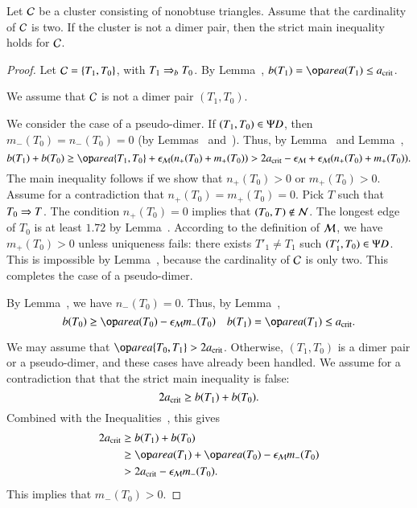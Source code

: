 \begin{lemma} 
  Let $\mathcal C$ be a cluster consisting of nonobtuse triangles.  Assume
  that the cardinality of $\mathcal C$ is two.  If the cluster is not a dimer
  pair, then the strict main inequality holds for $\mathcal C$.
\end{lemma}

\begin{proof}  
  Let $\mathcal C = \{T_1,T_0\}$, with $T_1\Rightarrow_{b} T_0$. By
  Lemma~, $b(T_1)=\area(T_1)\le \acrit$.

  We assume that $\mathcal C$ is not a dimer pair $(T_1,T_0)$.

  We consider the case of a pseudo-dimer.  If $(T_1,T_0)\in\Psi D$, then
  $m_-(T_0)=n_-(T_0)=0$ (by Lemmas~
  and~).  Thus, by Lemma~ and
  Lemma~,
\[
b(T_1)+b(T_0) 
\ge \area\{T_1,T_0\} + \epsM (n_+(T_0) + m_+(T_0)) 
> 2\acrit - \epsM  + \epsM (n_+(T_0)+m_+(T_0)).
\]
The main inequality follows if we show that $n_+(T_0)>0$ or
$m_+(T_0)>0$.  Assume for a contradiction that $n_+(T_0)=m_+(T_0)=0$.
Pick $T$ such that $T_0\Rightarrow T$.  The condition $n_+(T_0)=0$ implies
that $(T_0,T)\not\in\mathcal N$.  The longest edge of $T_0$ is at least $1.72$
by Lemma~.  According to the definition of $\mathcal M$, we
have $m_+(T_0)>0$ unless uniqueness fails: there exists $T'_1\ne T_1$
such $(T'_1,T_0)\in\Psi D$.  This is impossible by
Lemma~, because the cardinality of $\mathcal C$ is only two.
This completes the case of a pseudo-dimer.

By Lemma~, we have $n_-(T_0)=0$.  Thus,
by Lemma~,
\begin{equation}\libel{eqn:2}
b(T_0) \ge \area(T_0)  - \epsM m_-(T_0)
\quad b(T_1) = \area(T_1) \le \acrit.
\end{equation}

We may assume that $\area\{T_0,T_1\}> 2\acrit$.  Otherwise,
$(T_1,T_0)$ is a dimer pair or a pseudo-dimer, and these cases have
already been handled.  We assume for a contradiction that that the
strict main inequality is false:
\[
2a_\text{crit} \ge b(T_1) + b(T_0).
\]
Combined with the Inequalities~,
this gives
\begin{align*}
2\acrit &\ge b(T_1) + b(T_0) \\
&\ge \area(T_1) + \area(T_0)  - \epsM m_-(T_0)\\
&> 2\acrit  - \epsM m_-(T_0).
\end{align*}
This implies that  $m_-(T_0) > 0$.


\end{proof}
